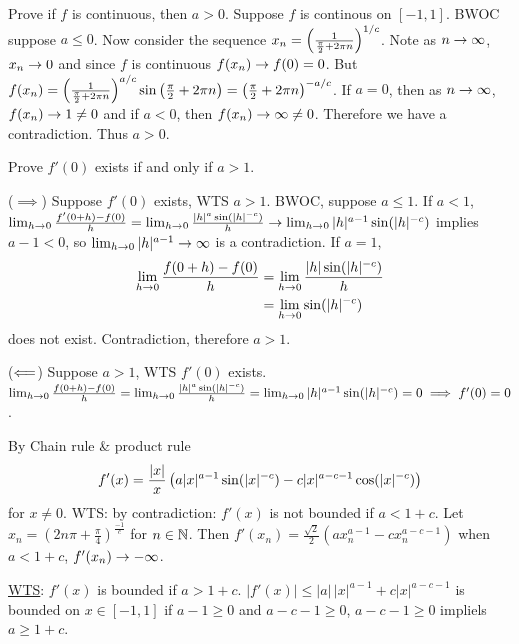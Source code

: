 \documentclass[]{article}
\begin{document}
\begin{example}
	Prove if $f$ is continuous, then $a>0$.
	Suppose $f$ is continous on $[-1,1]$. BWOC suppose $a\leq0$. Now consider the sequence $x_n = \left(\frac1{\frac\pi2+2\pi n}\right)^{1/c}$.
	Note as $n\rightarrow\infty$, $x_n\rightarrow0$ and since $f$ is continuous $f(x_n) \rightarrow f(0) = 0$.
	But $f(x_n) = \left(\frac1{\frac\pi2+2\pi n}\right)^{a/c}\sin\left(\frac\pi2+2\pi  n\right) = \left(\frac\pi2+2\pi n\right)^{-a/c}$.
	If $a=0$, then as $n\rightarrow\infty$, $f(x_n)\rightarrow1\neq0$ and if $a<0$, then $f(x_n)\rightarrow\infty\neq0$. Therefore we have a contradiction. Thus $a>0$.
\end{example}

\begin{example}
	Prove $f'(0)$ exists if and only if $a>1$.

	($\implies$) Suppose $f'(0)$ exists, WTS $a>1$.
	BWOC, suppose $a\leq 1$. If $a<1$, $\lim_{h\rightarrow0} \frac{f'(0+h)-f(0)}h = \lim_{h\rightarrow0} \frac{|h|^a\sin(|h|^{-c})}h \rightarrow \lim_{h\rightarrow0} |h|^{a-1} \sin(|h|^{-c})$ implies $a-1<0$, so $\lim_{h\rightarrow0}|h|^{a-1} \rightarrow \infty$ is a contradiction.
	If $a=1$, 
	\begin{align*}
		\lim_{h\rightarrow0} \frac{f(0+h)-f(0)}h &= \lim_{h\rightarrow0} \frac{|h|\sin(|h|^{-c})}h \\
										 &= \lim_{h\rightarrow0} \sin(|h|^{-c})
	\end{align*}
	does not exist. Contradiction, therefore $a>1$.

	($\Longleftarrow$) Suppose $a>1$, WTS $f'(0)$ exists. $\lim_{h\rightarrow0} \frac{f(0+h)-f(0)}h = \lim_{h\rightarrow0} \frac{|h|^a\sin(|h|^{-c})}h = \lim_{h\rightarrow0} |h|^{a-1}\sin(|h|^{-c}) = 0 \implies f'(0) = 0$.
\end{example}

\begin{example}
	[3] By Chain rule \& product rule $$ f'(x) = \frac{|x|}x\left(a|x|^{a-1}\sin(|x|^{-c}) - c|x|^{a-c-1} \cos(|x|^{-c})\right) $$ for $x\neq0$.
	WTS: by contradiction: $f'(x)$ is not bounded if $a<1+c$. 
	Let $x_n = (2n\pi+\frac\pi4)^{\frac{-1}c}$ for $n\in\mathbb{N}$.
	Then $f'(x_n) = \frac{\sqrt2}2 (ax_n^{a-1}-cx_n^{a-c-1})$ when $a<1+c$, $f'(x_n)\rightarrow-\infty$.

	\ul{WTS}: $f'(x)$ is bounded if $a>1+c$. $|f'(x)| \leq |a|\,|x|^{a-1} + c|x|^{a-c-1}$ is bounded on $x\in[-1,1]$ if $a-1\geq0$ and $a-c-1\geq0$, $a-c-1\geq0$ impliels $a\geq 1+c$.
\end{example}
\fi
\end{document}
